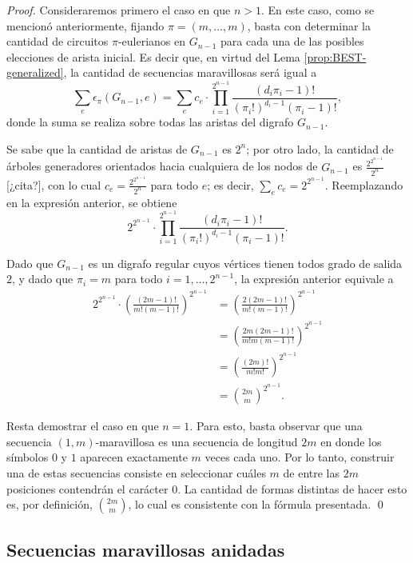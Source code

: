 \documentclass[11pt]{article}
\begin{document}
\begin{proof}
	Consideraremos primero el caso en que $n > 1$.
	En este caso, como se mencionó anteriormente, fijando $\pi = (m, \dots, m)$,
	basta con determinar la cantidad de circuitos $\pi$-eulerianos en $G_{n-1}$
	para cada una de las posibles elecciones de arista inicial.
	Es decir que, en virtud del Lema \ref{prop:BEST-generalized}, la cantidad de
	secuencias maravillosas será igual a \[ \sum_e \epsilon_\pi(G_{n-1}, e) =
		\sum_e c_e \cdot \prod_{i=1}^{2^{n-1}} \frac{(d_i\pi_i - 1)!
		}{(\pi_i!)^{d_i-1}(\pi_i-1)!}, \] donde la suma se realiza sobre todas las
	aristas del digrafo $G_{n-1}$.

	Se sabe que la cantidad de aristas de $G_{n-1}$ es $2^n$; por otro lado, la
	cantidad de árboles generadores orientados hacia cualquiera de los nodos de
	$G_{n-1}$ es $\frac{2^{2^{n-1}}}{2^n}$ [¿cita?], con lo cual $c_e =
		\frac{2^{2^{n-1}}}{2^n}$ para todo $e$; es decir, $\sum_{e} c_e = 2^{2^{n-1}}$.
	Reemplazando en la expresión anterior, se obtiene \[ 2^{2^{n-1}} \cdot
		\prod_{i=1}^{2^{n-1}} \frac{(d_i\pi_i - 1)! }{(\pi_i!)^{d_i-1}(\pi_i-1)!}.
	\]

	Dado que $G_{n-1}$ es un digrafo regular cuyos vértices tienen todos grado de
	salida $2$, y dado que $\pi_i = m$ para todo $i = 1, \dots, 2^{n-1}$, la
	expresión anterior equivale a
	\begin{align*}
		2^{2^{n-1}} \cdot \left( \frac{(2m - 1)! }{m!(m-1)!} \right)^{2^{n-1}}
			&= \left( \frac{2 (2m - 1)! }{m!(m-1)!} \right)^{2^{n-1}} \\
			&= \left( \frac{2m (2m - 1)! }{m!m(m-1)!} \right)^{2^{n-1}} \\
			&= \left( \frac{(2m)! }{m!m!} \right)^{2^{n-1}} \\
			&= \binom{2m}{m}^{2^{n-1}}.
	\end{align*}

	Resta demostrar el caso en que $n = 1$. Para esto, basta observar que una
	secuencia $(1,m)$-maravillosa es una secuencia de longitud $2m$ en donde
	los símbolos $0$ y $1$ aparecen exactamente $m$ veces cada uno. Por lo tanto,
	construir una de estas secuencias consiste en seleccionar cuáles $m$ de entre
	las $2m$ posiciones contendrán el carácter $0$. La cantidad de formas distintas
	de hacer esto es, por definición, $\binom{2m}{m}$, lo cual es consistente con
	la fórmula presentada. \qed
\end{proof}

\subsection{Secuencias maravillosas anidadas}
\end{document}
